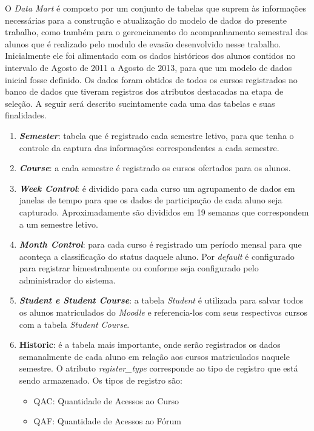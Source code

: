
O \textit{Data Mart} é composto por um conjunto de tabelas que suprem às informações necessárias para a construção e atualização do modelo de dados do presente trabalho, como também para o gerenciamento do acompanhamento semestral dos alunos que é realizado pelo modulo de evasão desenvolvido nesse trabalho. Inicialmente ele foi alimentado com os dados históricos dos alunos contidos no intervalo de Agosto de 2011 a Agosto de 2013, para que um modelo de dados inicial fosse definido. Os dados foram obtidos de todos os cursos registrados no banco de dados que tiveram registros dos atributos destacadas na etapa de seleção. A seguir será descrito sucintamente cada uma das tabelas e suas finalidades.

\begin{enumerate}
\item \textbf{\textit{Semester}}: tabela que é registrado cada semestre letivo, para que tenha o controle da captura das informações correspondentes a cada semestre.
\item \textbf{\textit{Course}}: a cada semestre é registrado os cursos ofertados para os alunos.
\item \textbf{\textit{Week Control}}: é dividido para cada curso um agrupamento de dados em janelas de tempo para que os dados de participação de cada aluno seja capturado. Aproximadamente são divididos em 19 semanas que correspondem a um semestre letivo.
\item \textbf{\textit{Month Control}}: para cada curso é registrado um período mensal para que aconteça a classificação do status daquele aluno. Por \textit{default} é configurado para registrar bimestralmente ou conforme seja configurado pelo administrador do sistema.
\item \textbf{\textit{Student e Student Course}}: a tabela \textit{Student} é utilizada para salvar todos os alunos matriculados do \textit{Moodle} e referencia-los com seus respectivos cursos com a tabela \textit{Student Course}.
\item \textbf{Historic}: é a tabela mais importante, onde serão registrados os dados semanalmente de cada aluno em relação aos cursos matriculados naquele semestre. O atributo \textit{register\_type} corresponde ao tipo de registro que está sendo armazenado. Os tipos de registro são:
\begin{itemize}
\item QAC: Quantidade de Acessos ao Curso
\item QAF: Quantidade de Acessos ao Fórum

\end{itemize}
\end{enumerate}
